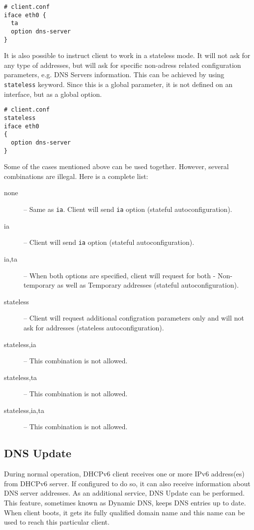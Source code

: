 \begin{Verbatim}
# client.conf
iface eth0 {
  ta
  option dns-server
}
\end{Verbatim}

It is also possible to instruct client to work in a stateless mode. It
will not ask for any type of addresses, but will ask for specific
non-adress related configuration parameters, e.g. DNS Servers
information. This can be achieved by using \verb+stateless+
keyword. Since this is a global parameter, it is not defined on an
interface, but as a global option.

\begin{Verbatim}
# client.conf
stateless
iface eth0
{
  option dns-server
}
\end{Verbatim}

Some of the cases mentioned above can be used together. However,
several combinations are illegal. Here is a complete list:
\begin{description}
\item[none] -- Same as \verb+ia+. Client will send \verb+ia+ option
  (stateful autoconfiguration).
\item[ia] -- Client will send \verb+ia+ option (stateful
  autoconfiguration).
\item[ia,ta] -- When both options are specified, client will request
  for both - Non-temporary as well as Temporary addresses (stateful
  autoconfiguration).
\item[stateless] -- Client will request additional configration
  parameters only and will not ask for addresses (stateless
  autoconfiguration).
\item[stateless,ia] -- This combination is not allowed.
\item[stateless,ta] -- This combination is not allowed.
\item[stateless,ia,ta] -- This combination is not allowed.
\end{description}

\subsection{DNS Update}
\label{features-fqdn}
During normal operation, DHCPv6 client receives one or more IPv6 address(es)
from DHCPv6 server. If configured to do so, it can also receive
information about DNS server addresses. As an additional service, DNS
Update can be performed. This feature, sometimes known as Dynamic DNS,
keeps DNS entries up to date. When client boots, it gets its fully
qualified domain name and this name can be used to reach this
particular client.


